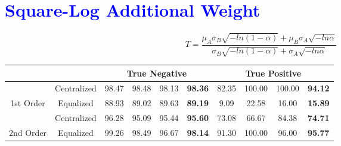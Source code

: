 \documentclass[10pt,a4paper]{article}
\begin{document}
	\section{\textcolor{blue}{Square-Log Additional Weight}}
		$$
		T = \frac{\mu_A \sigma_B \sqrt{-ln(1 - \alpha)}
			+ \mu_B \sigma_A \sqrt{-ln\alpha}}
		{\sigma_B \sqrt{-ln(1 - \alpha)} + \sigma_A \sqrt{-ln\alpha}}
		$$
		\begin{table}[!ht]
			\centering
			\begin{tabular}{|c|c|c|c|c|c|c|c|c|c|}
				\hline
				&             & \multicolumn{4}{c|}{True Negative}                            & \multicolumn{4}{c|}{True Positive}                              \\ \hline
				& Centralized & 98.47 & 98.48 & 98.13 & {\color[HTML]{FE0000} \textbf{98.36}} & 82.35 & 100.00 & 100.00 & {\color[HTML]{FE0000} \textbf{94.12}} \\ \cline{2-10} 
				\multirow{-2}{*}{1st Order} & Equalized   & 88.93 & 89.02 & 89.63 & {\color[HTML]{FE0000} \textbf{89.19}} & 9.09  & 22.58  & 16.00  & {\color[HTML]{FE0000} \textbf{15.89}} \\ \hline
				& Centralized & 96.28 & 95.09 & 95.44 & {\color[HTML]{FE0000} \textbf{95.60}} & 73.08 & 66.67  & 84.38  & {\color[HTML]{FE0000} \textbf{74.71}} \\ \cline{2-10} 
				\multirow{-2}{*}{2nd Order} & Equalized   & 99.26 & 98.49 & 96.67 & {\color[HTML]{FE0000} \textbf{98.14}} & 91.30 & 100.00 & 96.00  & {\color[HTML]{FE0000} \textbf{95.77}} \\ \hline
			\end{tabular}
		\end{table}
		
\end{document}
